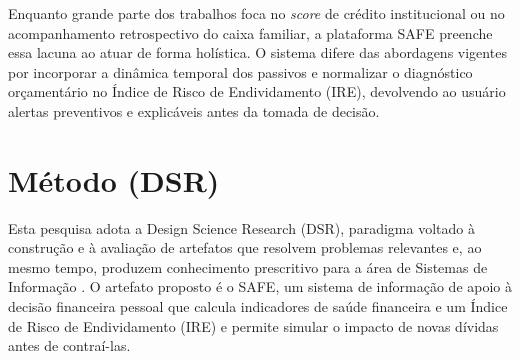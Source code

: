 \documentclass[portuguese]{sbc2025}%
\begin{document}
\begin{table}[!ht]
\caption{Comparativo entre soluções existentes e a plataforma SAFE.}
\centering
\label{tab_comparativa}
\end{table}

Enquanto grande parte dos trabalhos foca no \textit{score} de crédito institucional ou no acompanhamento retrospectivo do caixa familiar, a plataforma SAFE preenche essa lacuna ao atuar de forma holística. O sistema difere das abordagens vigentes por incorporar a dinâmica temporal dos passivos e normalizar o diagnóstico orçamentário no Índice de Risco de Endividamento (IRE), devolvendo ao usuário alertas preventivos e explicáveis antes da tomada de decisão.

\section{Método (DSR)}

Esta pesquisa adota a Design Science Research (DSR), paradigma voltado à construção e à avaliação de artefatos que resolvem problemas relevantes e, ao mesmo tempo, produzem conhecimento prescritivo para a área de Sistemas de Informação \citep{hevner2004}. O artefato proposto é o SAFE, um sistema de informação de apoio à decisão financeira pessoal que calcula indicadores de saúde financeira e um Índice de Risco de Endividamento (IRE) e permite simular o impacto de novas dívidas antes de contraí-las.
\end{document}
